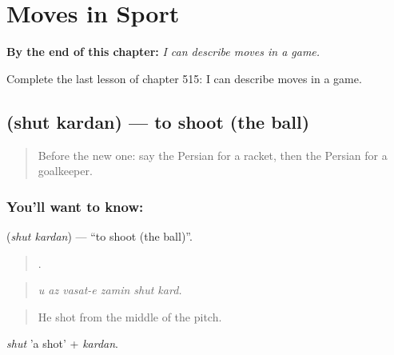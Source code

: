 
\chapter{Moves in Sport}
\label{ch:fa-moves-in-sport}

\begin{chapteropening}
\textbf{By the end of this chapter:} \emph{I can describe moves in a game.}

Complete the last lesson of chapter 515: I can describe moves in a game.
\end{chapteropening}

\section[\texorpdfstring{\fa{شوت} \fa{کردن} (shut kardan)}{شوت کردن (shut kardan)}]{  (shut kardan) — to shoot (the ball)}

\label{lesson:FA-C515-shut-kardan}



\begin{quote}
Before the new one: say the Persian for a racket, then the Persian for a goalkeeper.
\end{quote}

\subsection*{You'll want to know:  }
\textbf{ } (\emph{shut kardan}) — \textquotedblleft{}to shoot (the ball)\textquotedblright{}.

\begin{quote}
     .
\end{quote}

\begin{quote}
\emph{u az vasat-e zamin shut kard.}
\end{quote}

\begin{quote}
He shot from the middle of the pitch.
\end{quote}

\emph{shut} 'a shot' + \emph{kardan}.

